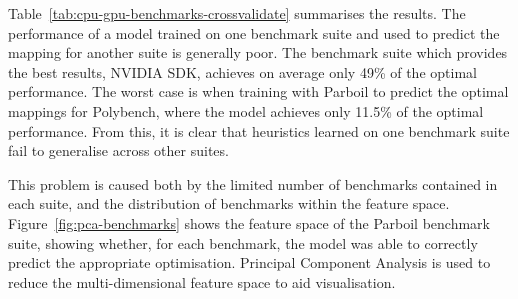 Table~\ref{tab:cpu-gpu-benchmarks-crossvalidate} summarises the results. The performance of a model trained on one benchmark suite and used to predict the mapping for another suite is generally poor. The benchmark suite which provides the best results, NVIDIA SDK, achieves on average only 49\% of the optimal performance. The worst case is when training with Parboil to predict the optimal mappings for Polybench, where the model achieves only 11.5\% of the optimal performance. From this, it is clear that heuristics learned on one benchmark suite fail to generalise across other suites.

\begin{table}
	\centering
	
  \caption[Cross-validation of benchmark suites on a predictive model]{%
    Performance relative to the optimal of the \citeauthor{Grewe2013} predictive model across different benchmark suites on an AMD GPU. The columns show the suite used for training; the rows show the suite used for testing. On average, a predictive model trained on one benchmark suite and tested on another achieves only 49\% of the optimal performance.%
  }
  \label{tab:cpu-gpu-benchmarks-crossvalidate}
\end{table}

This problem is caused both by the limited number of benchmarks contained in each suite, and the distribution of benchmarks within the feature space. Figure~\ref{fig:pca-benchmarks} shows the feature space of the Parboil benchmark suite, showing whether, for each benchmark, the model was able to correctly predict the appropriate optimisation. Principal Component Analysis is used to reduce the multi-dimensional feature space to aid visualisation.

